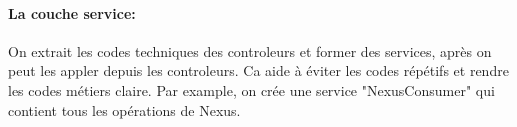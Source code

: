 \paragraph{La couche service:}
On extrait les codes techniques des controleurs et former des services, après on peut les appler depuis les controleurs.
Ca aide à éviter les codes répétifs et rendre les codes métiers claire.
Par example, on crée une service "NexusConsumer" qui contient tous les opérations de Nexus.

\clearpage
